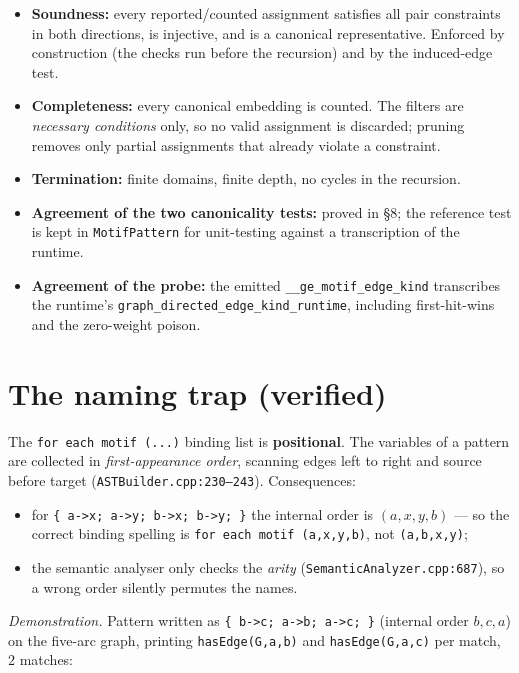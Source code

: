 \documentclass[11pt,a4paper]{article}
\newcommand{\code}[1]{\texttt{#1}}
\newcommand{\file}[1]{\texttt{#1}}
\begin{document}
\begin{itemize}
  \item \textbf{Soundness:} every reported/counted assignment satisfies all
        pair constraints in both directions, is injective, and is a canonical
        representative. Enforced by construction (the checks run before the
        recursion) and by the induced-edge test.
  \item \textbf{Completeness:} every canonical embedding is counted. The filters
        are \emph{necessary conditions} only, so no valid assignment is
        discarded; pruning removes only partial assignments that already violate
        a constraint.
  \item \textbf{Termination:} finite domains, finite depth, no cycles in the
        recursion.
  \item \textbf{Agreement of the two canonicality tests:} proved in \S 8; the
        reference test is kept in \file{MotifPattern} for unit-testing against a
        transcription of the runtime.
  \item \textbf{Agreement of the probe:} the emitted
        \code{\_\_ge\_motif\_edge\_kind} transcribes the runtime's
        \code{graph\_directed\_edge\_kind\_runtime}, including first-hit-wins and
        the zero-weight poison.
\end{itemize}

\section{The naming trap (verified)}

The \code{for each motif (...)} binding list is \textbf{positional}. The
variables of a pattern are collected in \emph{first-appearance order}, scanning
edges left to right and source before target (\file{ASTBuilder.cpp:230--243}).
Consequences:

\begin{itemize}
  \item for \code{\{ a->x; a->y; b->x; b->y; \}} the internal order is
        $(a,x,y,b)$ --- so the correct binding spelling is
        \code{for each motif (a,x,y,b)}, not \code{(a,b,x,y)};
  \item the semantic analyser only checks the \emph{arity}
        (\file{SemanticAnalyzer.cpp:687}), so a wrong order silently permutes the
        names.
\end{itemize}

\noindent\emph{Demonstration.} Pattern written as \code{\{ b->c; a->b; a->c; \}}
(internal order $b,c,a$) on the five-arc graph, printing
\code{hasEdge(G,a,b)} and \code{hasEdge(G,a,c)} per match, $2$ matches:
\end{document}
